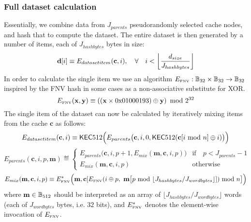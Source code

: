 \subsubsection{Full dataset calculation} \label{app:dataset}
Essentially, we combine data from $J_{parents}$ pseudorandomly selected cache nodes, and hash that to compute the dataset. The entire dataset is then generated by a number of items, each of $J_{hashbytes}$ bytes in size:
\begin{equation}
\mathbf{d}[i] \equiv E_{datasetitem}(\mathbf{c}, i), \quad \forall \quad i < \left\lfloor\frac{d_{size}}{J_{hashbytes}}\right\rfloor
\end{equation}
In order to calculate the single item we use an algorithm $E_\text{\tiny FNV}:\mathbb{B}_{32}\times\mathbb{B}_{32} \to \mathbb{B}_{32}$ inspired by the FNV hash \cite{FowlerNollVo1991FNVHash} in some cases as a non-associative substitute for XOR.
\begin{equation}
	E_\text{\tiny FNV}(\mathbf{x}, \mathbf{y}) \equiv \left( (\mathbf{x} \times \mathrm{0x01000193}) \oplus \mathbf{y}\right) \mbox{ mod } 2^{32}
\end{equation}
The single item of the dataset can now be calculated by iteratively mixing items from the cache $\mathbf{c}$ as follows:
\begin{equation}
 E_{datasetitem}(\mathbf{c}, i) \equiv 
 \mathsf{KEC}512\Big(E_{parents}\big(\mathbf{c}, i, 0, \mathsf{KEC}512(\mathbf{c}[i \mbox{ mod } n ] \oplus i)\big)\Big)
\end{equation}
\begin{equation}
  E_{parents}(\mathbf{c}, i, p, \mathbf{m}) \eqdef \begin{cases}
E_{parents}\big(\mathbf{c}, i, p +1, E_{mix}(\mathbf{m}, \mathbf{c}, i, p)\big) & \text{if} \quad p < J_{parents} -1 \\
E_{mix}(\mathbf{m}, \mathbf{c}, i, p) & \text{otherwise}
\end{cases}
\end{equation}
\begin{equation}
 E_{mix}(\mathbf{m}, \mathbf{c}, i, p) \equiv E_\text{\tiny FNV}^*\Big(\mathbf{m}, \mathbf{c}[E_\text{\tiny FNV}(i \oplus p, ~ \mathbf{m}\big[p \mbox{ mod } \lfloor J_{hashbytes} / J_{wordbytes} \rfloor ]) \mbox{ mod } n \big] \Big)
\end{equation}
where $\mathbf{m}\in\mathbb{B}_{512}$ should be interpreted as an array of $\lfloor J_{hashbytes} / J_{wordbytes} \rfloor$ words (each of $J_{wordbytes}$ bytes, i.e. $32$ bits),
and $E_\text{\tiny FNV}^*$ denotes the element-wise invocation of $E_\text{\tiny FNV}$.

